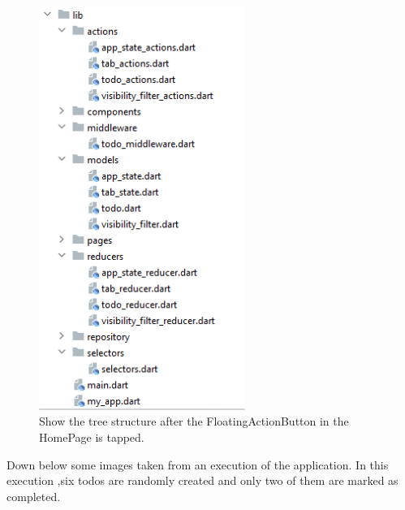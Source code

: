 \begin{figure}[H]
    \centering
    \includegraphics[width=0.6\textwidth]{Images/struttura_cartelle_redux.png}
    \caption{Show the tree structure after the FloatingActionButton in the HomePage is tapped.}
    \label{fig:add_todo_page_tree_structure}
\end{figure}
Down below some images taken from an execution of the application. In this execution ,six todos are randomly created and only two of them are marked as completed. 

